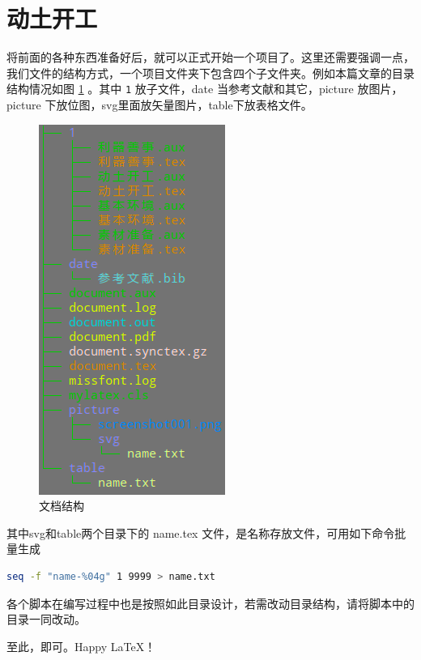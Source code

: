 \section{动土开工}

将前面的各种东西准备好后，就可以正式开始一个项目了。这里还需要强调一点，我们文件的结构方式，一个项目文件夹下包含四个子文件夹。例如本篇文章的目录结构情况如图 \ref{fig:screenshot002} 。其中 \lstinline|1| 放子文件，date 当参考文献和其它，picture 放图片，picture 下放位图，svg里面放矢量图片，table下放表格文件。 
\begin{figure}[h!]
	\centering
	\includegraphics[width=0.2\linewidth]{picture/screenshot002}
	\caption{文档结构}
	\label{fig:screenshot002}
\end{figure}

其中svg和table两个目录下的 name.tex 文件，是名称存放文件，可用如下命令批量生成
\begin{lstlisting}[language=bash]
seq -f "name-%04g" 1 9999 > name.txt
\end{lstlisting}
各个脚本在编写过程中也是按照如此目录设计，若需改动目录结构，请将脚本中的目录一同改动。


至此，即可。Happy \LaTeX ！




